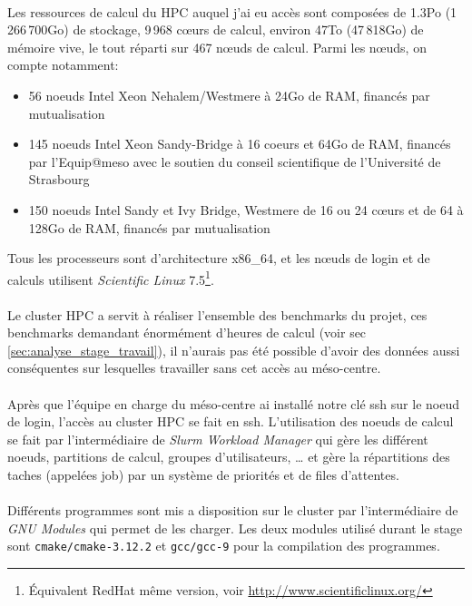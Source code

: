 \documentclass[a4paper,11pt,twoside,french,report]{../common/simplem}
\begin{document}
				\paragraph*{}
					Les ressources de calcul du \gls{HPC} auquel j'ai eu accès sont composées de 1.3Po (1\,266\,700Go) de stockage, 9\,968 cœurs de calcul, environ 47To (47\,818Go) de mémoire vive, le tout réparti sur 467 nœuds de calcul. Parmi les nœuds, on compte notamment:
					\begin{itemize}
						\item 56 noeuds Intel Xeon Nehalem/Westmere à 24Go de RAM, financés par mutualisation
						\item 145 noeuds Intel Xeon Sandy-Bridge à 16 coeurs et 64Go de RAM, financés par l'\gls{Equip@meso} avec le soutien du conseil scientifique de l'Université de Strasbourg
						\item 150 noeuds Intel Sandy et Ivy Bridge, Westmere de 16 ou 24 cœurs et de 64 à 128Go de RAM, financés par mutualisation
					\end{itemize}
					Tous les processeurs sont d'architecture x86\_64, et les nœuds de login et de calculs utilisent \textit{Scientific Linux} 7.5\footnote{Équivalent RedHat même version, voir \url{http://www.scientificlinux.org/}}.
				\paragraph*{}
					Le cluster \gls{HPC} a servit à réaliser l'ensemble des benchmarks du projet, ces benchmarks demandant énormément d'heures de calcul (voir sec \ref{sec:analyse_stage_travail}), il n'aurais pas été possible d'avoir des données aussi conséquentes sur lesquelles travailler sans cet accès au méso-centre.
				\paragraph*{}
					Après que l'équipe en charge du méso-centre ai installé notre clé ssh sur le noeud de login, l'accès au cluster \gls{HPC} se fait en ssh. L'utilisation des noeuds de calcul se fait par l'intermédiaire de \textit{Slurm Workload Manager} qui gère les différent noeuds, partitions de calcul, groupes d'utilisateurs, \ldots{} et gère la répartitions des taches (appelées job) par un système de priorités et de files d'attentes.
				\paragraph*{}
					Différents programmes sont mis a disposition sur le cluster par l'intermédiaire de \textit{GNU Modules} qui permet de les charger. Les deux modules utilisé durant le stage sont \texttt{cmake/cmake-3.12.2} et \texttt{gcc/gcc-9} pour la compilation des programmes.
\end{document}
